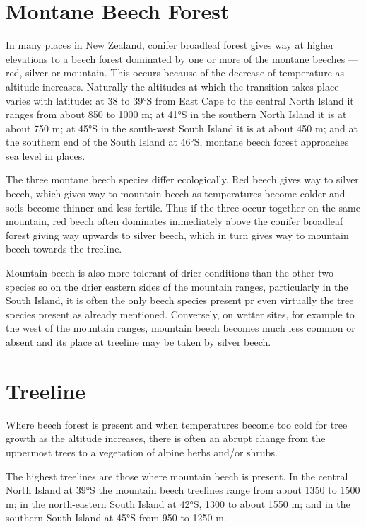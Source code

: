 \section{Montane Beech Forest}

In many places in New Zealand, conifer broadleaf forest gives way at higher elevations to a beech forest dominated by one or more of the montane beeches --- red, silver or mountain.
This occurs because of the decrease of temperature as altitude increases.
Naturally the altitudes at which the transition takes place varies with latitude: at 38 to 39°S from East Cape to the central North Island it ranges from about 850 to 1000 m; at 41°S in the southern North Island it is at about 750 m; at 45°S in the south-west South Island it is at about 450 m; and at the southern end of the South Island at 46°S, montane beech forest approaches sea level in places.

The three montane beech species differ ecologically.
Red beech gives way to silver beech, which gives way to mountain beech as temperatures become colder and soils become thinner and less fertile.
Thus if the three occur together on the same mountain, red beech often dominates immediately above the conifer broadleaf forest giving way upwards to silver beech, which in turn gives way to mountain beech towards the treeline.

Mountain beech is also more tolerant of drier conditions than the other two species so on the drier eastern sides of the mountain ranges, particularly in the South Island, it is often the only beech species present pr even virtually the  tree species present as already mentioned.
Conversely, on wetter sites, for example to the west of the mountain ranges, mountain beech becomes much less common or absent and its place at treeline may be taken by silver beech.

\section{Treeline}

Where beech forest is present and when temperatures become too cold for tree growth as the altitude increases, there is often an abrupt change from the uppermost trees to a vegetation of alpine herbs and/or shrubs.

The highest treelines are those where mountain beech is present.
In the central North Island at 39°S the mountain beech treelines range from about 1350 to 1500 m; in the north-eastern South Island at 42°S, 1300 to about 1550 m; and in the southern South Island at 45°S from 950 to 1250 m.

